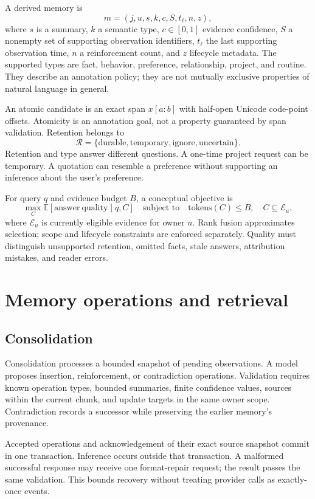 \documentclass[11pt]{article}
\newcommand{\E}{\mathbb{E}}
\begin{document}
A derived memory is
\[
 m=(j,u,s,k,c,S,t_\ell,n,z),
\]
where $s$ is a summary, $k$ a semantic type, $c\in[0,1]$ evidence confidence, $S$ a nonempty set of supporting observation identifiers, $t_\ell$ the last supporting observation time, $n$ a reinforcement count, and $z$ lifecycle metadata. The supported types are fact, behavior, preference, relationship, project, and routine. They describe an annotation policy; they are not mutually exclusive properties of natural language in general.

An atomic candidate is an exact span $x[a:b]$ with half-open Unicode code-point offsets. Atomicity is an annotation goal, not a property guaranteed by span validation. Retention belongs to
\[
 \mathcal{R}=\{\text{durable},\text{temporary},\text{ignore},\text{uncertain}\}.
\]
Retention and type answer different questions. A one-time project request can be temporary. A quotation can resemble a preference without supporting an inference about the user's preference.

For query $q$ and evidence budget $B$, a conceptual objective is
\[
 \max_C \E[\mathrm{answer\ quality}\mid q,C]
 \quad\text{subject to}\quad
 \mathrm{tokens}(C)\leq B,\quad C\subseteq\mathcal{E}_u,
\]
where $\mathcal{E}_u$ is currently eligible evidence for owner $u$. Rank fusion approximates selection; scope and lifecycle constraints are enforced separately. Quality must distinguish unsupported retention, omitted facts, stale answers, attribution mistakes, and reader errors.

\section{Memory operations and retrieval}
\subsection{Consolidation}
Consolidation processes a bounded snapshot of pending observations. A model proposes insertion, reinforcement, or contradiction operations. Validation requires known operation types, bounded summaries, finite confidence values, sources within the current chunk, and update targets in the same owner scope. Contradiction records a successor while preserving the earlier memory's provenance.

Accepted operations and acknowledgement of their exact source snapshot commit in one transaction. Inference occurs outside that transaction. A malformed successful response may receive one format-repair request; the result passes the same validation. This bounds recovery without treating provider calls as exactly-once events.
\end{document}
